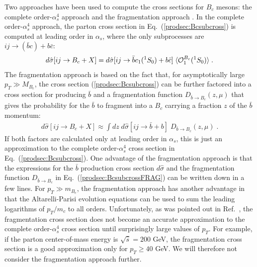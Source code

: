 Two approaches have been used to compute the cross sections for $B_c$
mesons: the complete order-$\alpha_s^4$ approach
\cite{Chang:1992jb,Chang:1994aw,Chang:1996jt,%
Kolodziej:1995nv,Berezhnoy:an,Baranov:wy}
and the fragmentation approach \cite{Braaten:1993jn,Cheung:1999ir}.  In
the complete order-$\alpha_s^4$ approach, the parton cross section
in Eq.~(\ref{prodsec:Bcsubcross}) is computed at leading order in
$\alpha_s$, where the only subprocesses are 
$i j \to (\bar b c) + b \bar c $:
%
\begin{eqnarray}
d\hat{\sigma}[ij \rightarrow B_{c} + X] =
d\hat{\sigma}[ij \rightarrow \bar b c_1({}^1S_0) + b \bar c] \;
\langle  {\cal O}^{B_c}_1(^1S_0) \rangle \;.
\label{prodsec:BcsubcrossLO}
\end{eqnarray}
%
The fragmentation approach is based on the fact that,
for asymptotically large $p_T \gg M_{B_c}$, 
the cross section (\ref{prodsec:Bcsubcross})
can be further factored into a cross section for producing
$\bar b$ and a fragmentation function $D_{\bar b \to B_c}(z,\mu)$
that gives the probability for the $\bar b$ to fragment 
into a $B_c$ carrying a fraction $z$ of the $\bar b$ momentum:
%
\begin{eqnarray}
d\hat{\sigma}[ij \rightarrow B_{c} + X] \approx
\int dz \; d\hat{\sigma}[ij \rightarrow \bar b  + b ] \;
D_{\bar b \to B_c}(z,\mu) \;.
\label{prodsec:BcsubcrossFRAG}
\end{eqnarray}
%
If both factors are calculated only at leading order in $\alpha_s$, this
is just an approximation to the complete order-$\alpha_s^4$ cross
section in Eq.~(\ref{prodsec:Bcsubcross}). One advantage of the
fragmentation approach is that the expressions for the $\bar b$
production cross section $ d\hat{\sigma}$ and the fragmentation
function $D_{\bar b \to B_c}$ in Eq.~(\ref{prodsec:BcsubcrossFRAG})
can be written down in a few lines. For $p_T \gg m_{B_c}$, the
fragmentation approach has another advantage in that the
Altarelli-Parisi evolution equations can be used to sum the leading
logarithms of $p_T/m_c$ to all orders. Unfortunately, as was pointed
out in Ref.~\cite{Chang:1994aw,Chang:1996jt,Kolodziej:1995nv}, the
fragmentation cross section does not become an accurate approximation to
the complete order-$\alpha_s^4$ cross section until surprisingly
large values of $p_T$. For example, if the parton center-of-mass energy
is $\sqrt{\hat{s}}=200$ GeV, the fragmentation cross section is a
good approximation only for $p_T \geq 40$ GeV.  We will therefore not
consider the fragmentation approach further.


